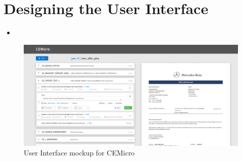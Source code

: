 

\section{Designing the User Interface}

\begin{itemize}
  \item {}
\end{itemize}

\begin{figure}
  \centering
  \includegraphics[width=\linewidth]{assets/cemicro-ui-mockup.png}
  \caption{User Interface mockup for CEMicro}
  \label{fig:mockup}
\end{figure}


